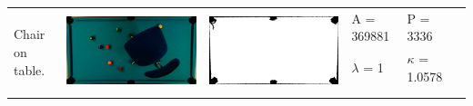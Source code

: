\begin{tabular}{|l|c|c|l|l|c|}
\multirow{4}{*}{Chair on table.} & \multirow{4}{*}{\includegraphics[scale=0.1]{../images/1/5_img.png}} & \multirow{4}{*}{\includegraphics[scale=0.1]{../images/1/5_mask.png}} & A = 369881 & P = 3336 & \multirow{4}{*}{}\\  
& & & $\lambda$ = 1 & $\kappa$ = 1.0578 & \\
&&&&&\\
&&&&&\\
\hline


\end{tabular}
